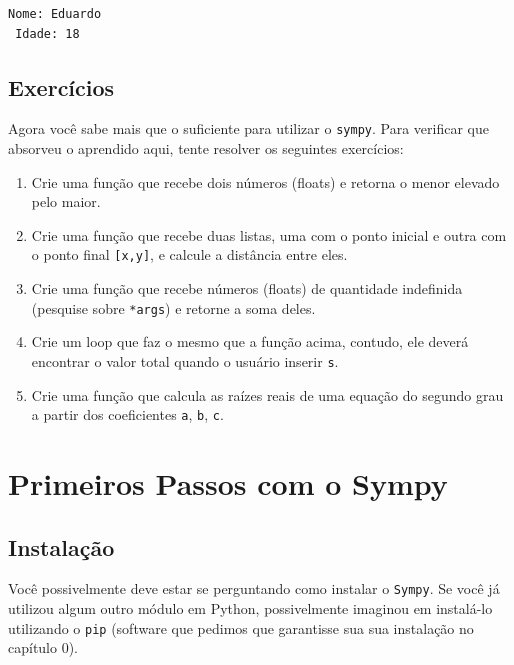 \documentclass[a4paper, 11pt, brazilian]{article}
\providecommand{\tightlist}{%
      \setlength{\itemsep}{0pt}\setlength{\parskip}{0pt}}
\begin{document}
    \begin{Verbatim}[commandchars=\\\{\}]
 Nome: Eduardo
 Idade: 18
    \end{Verbatim}

    \hypertarget{exercuxedcios}{%
\subsection{Exercícios}\label{exercuxedcios}}

Agora você sabe mais que o suficiente para utilizar o \texttt{sympy}.
Para verificar que absorveu o aprendido aqui, tente resolver os
seguintes exercícios:

\begin{enumerate}
\def\labelenumi{\arabic{enumi}.}
\tightlist
\item
  Crie uma função que recebe dois números (floats) e retorna o menor
  elevado pelo maior.
\item
  Crie uma função que recebe duas listas, uma com o ponto inicial e
  outra com o ponto final \texttt{{[}x,y{]}}, e calcule a distância
  entre eles.
\item
  Crie uma função que recebe números (floats) de quantidade indefinida
  (pesquise sobre \texttt{*args}) e retorne a soma deles.
\item
  Crie um loop que faz o mesmo que a função acima, contudo, ele deverá
  encontrar o valor total quando o usuário inserir
  \texttt{\textquotesingle{}s\textquotesingle{}}.
\item
  Crie uma função que calcula as raízes reais de uma equação do segundo
  grau a partir dos coeficientes \texttt{a}, \texttt{b}, \texttt{c}.
\end{enumerate}

    \hypertarget{primeiros-passos-com-o-sympy}{%
\section{Primeiros Passos com o
Sympy}\label{primeiros-passos-com-o-sympy}}

\hypertarget{instalauxe7uxe3o}{%
\subsection{Instalação}\label{instalauxe7uxe3o}}

Você possivelmente deve estar se perguntando como instalar o
\texttt{Sympy}. Se você já utilizou algum outro módulo em Python,
possivelmente imaginou em instalá-lo utilizando o \texttt{pip} (software
que pedimos que garantisse sua sua instalação no capítulo 0).
\end{document}
